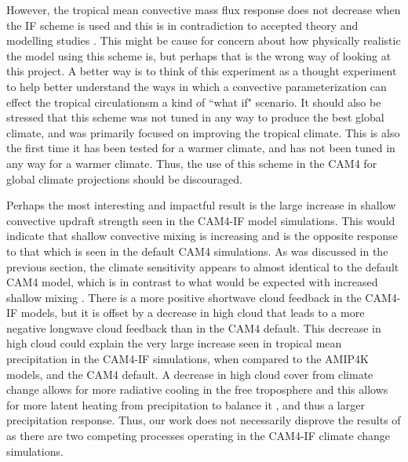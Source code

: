\documentclass[letterpaper,12pt,titlepage,oneside,final]{book}
\begin{document}
However, the tropical mean convective mass flux response does not decrease when the IF scheme is used and this is in contradiction to accepted theory \citep{held_robust_2006,vecchi_weakening_2006} and modelling studies \citep{chadwick_spatial_2012}. This might be cause for concern about how physically realistic the model using this scheme is, but perhaps that is the wrong way of looking at this project. A better way is to think of this experiment as a thought experiment to help better understand the ways in which a convective parameterization can effect the tropical circulationsm a kind of ``what if" scenario. It should also be stressed that this scheme was not tuned in any way to produce the best global climate, and was primarily focused on improving the tropical climate. This is also the first time it has been tested for a warmer climate, and has not been tuned in any way for a warmer climate. Thus, the use of this scheme in the CAM4 for global climate projections should be discouraged.

Perhaps the most interesting and impactful result is the large increase in shallow convective updraft strength seen in the CAM4-IF model simulations. This would indicate that shallow convective mixing is increasing and is the opposite response to that which is seen in the default CAM4 simulations. As was discussed in the previous section, the climate sensitivity appears to almost identical to the default CAM4 model, which is in contrast to what would be expected with increased shallow mixing \citep{sherwood_spread_2014}. There is a more positive shortwave cloud feedback in the CAM4-IF models, but it is offset by a decrease in high cloud that leads to a more negative longwave cloud feedback than in the CAM4 default. This decrease in high cloud could explain the very large increase seen in tropical mean precipitation in the CAM4-IF simulations, when compared to the AMIP4K models, and the CAM4 default. A decrease in high cloud cover from climate change allows for more radiative cooling in the free troposphere and this allows for more latent heating from precipitation to balance it \citep{su_tightening_2017}, and thus a larger precipitation response. Thus, our work does not necessarily disprove the results of \citep{sherwood_spread_2014} as there are two competing processes operating in the CAM4-IF climate change simulations.
\end{document}
